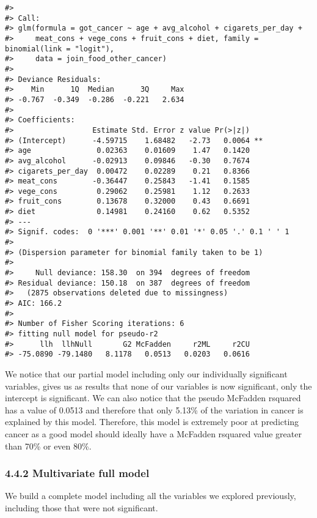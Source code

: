 \documentclass[
]{article}
\begin{document}
\begin{verbatim}
#> 
#> Call:
#> glm(formula = got_cancer ~ age + avg_alcohol + cigarets_per_day + 
#>     meat_cons + vege_cons + fruit_cons + diet, family = binomial(link = "logit"), 
#>     data = join_food_other_cancer)
#> 
#> Deviance Residuals: 
#>    Min      1Q  Median      3Q     Max  
#> -0.767  -0.349  -0.286  -0.221   2.634  
#> 
#> Coefficients:
#>                  Estimate Std. Error z value Pr(>|z|)   
#> (Intercept)      -4.59715    1.68482   -2.73   0.0064 **
#> age               0.02363    0.01609    1.47   0.1420   
#> avg_alcohol      -0.02913    0.09846   -0.30   0.7674   
#> cigarets_per_day  0.00472    0.02289    0.21   0.8366   
#> meat_cons        -0.36447    0.25843   -1.41   0.1585   
#> vege_cons         0.29062    0.25981    1.12   0.2633   
#> fruit_cons        0.13678    0.32000    0.43   0.6691   
#> diet              0.14981    0.24160    0.62   0.5352   
#> ---
#> Signif. codes:  0 '***' 0.001 '**' 0.01 '*' 0.05 '.' 0.1 ' ' 1
#> 
#> (Dispersion parameter for binomial family taken to be 1)
#> 
#>     Null deviance: 158.30  on 394  degrees of freedom
#> Residual deviance: 150.18  on 387  degrees of freedom
#>   (2875 observations deleted due to missingness)
#> AIC: 166.2
#> 
#> Number of Fisher Scoring iterations: 6
#> fitting null model for pseudo-r2
#>      llh  llhNull       G2 McFadden     r2ML     r2CU 
#> -75.0890 -79.1480   8.1178   0.0513   0.0203   0.0616
\end{verbatim}

We notice that our partial model including only our individually
significant variables, gives us as results that none of our variables is
now significant, only the intercept is significant. We can also notice
that the pseudo McFadden rsquared has a value of 0.0513 and therefore
that only 5.13\% of the variation in cancer is explained by this model.
Therefore, this model is extremely poor at predicting cancer as a good
model should ideally have a McFadden rsquared value greater than 70\% or
even 80\%.

\hypertarget{multivariate-full-model}{%
\subsubsection{4.4.2 Multivariate full
model}\label{multivariate-full-model}}

We build a complete model including all the variables we explored
previously, including those that were not significant.
\end{document}
